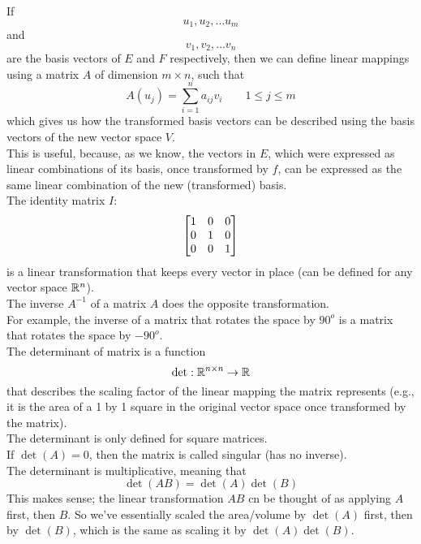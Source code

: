 \documentclass[12pt]{article}
\begin{document}
    If
    \[ u_1, u_2, \dots u_m \]
    and
    \[ v_1, v_2, \dots v_n \]
    are the basis vectors of $E$ and $F$
    respectively,
    then we can define linear mappings using 
    a matrix $A$ of dimension $m \times n$,
    such that 
    \[ A (u_j) = \sum_{i=1}^{n} a_{ij}v_i \qquad
    1 \leq j \leq m \]
    which gives us how the transformed basis
    vectors can be described using
    the basis vectors of the new vector space $V$. \\
    This is useful, because, as we know,
    the vectors in $E$,
    which were expressed as linear combinations
    of its basis,
    once transformed by $f$,
    can be expressed as the same linear combination
    of the new (transformed) basis. \\

    The identity matrix $I$:
    \[ \begin{bmatrix} 1 & 0 & 0 \\ 0 & 1 & 0 \\ 0 & 0 & 1 \end{bmatrix} \]
    is a linear transformation that keeps
    every vector in place
    (can be defined for any vector space $\mathbb{R}^n$). \\

    The inverse $A^{-1}$ of a matrix $A$
    does the opposite transformation. \\
    For example, the inverse of
    a matrix that rotates the space by $90^o$
    is a matrix that rotates the space by $-90^o$. \\

    The determinant of matrix is a function
    \[ \det: \mathbb{R}^{n \times n} \to \mathbb{R} \]
    that describes the scaling factor of the
    linear mapping the matrix represents
    (e.g., it is the area of a 1 by 1 square
    in the original vector space once
    transformed by the matrix). \\

    The determinant is only defined for square matrices. \\
    
    If $\det(A) = 0$,
    then the matrix is called singular
    (has no inverse). \\

    The determinant is multiplicative,
    meaning that
    \[ \det(AB) = \det(A)\det(B) \]
    This makes sense;
    the linear transformation $AB$
    cn be thought of as applying $A$
    first, then $B$.
    So we've essentially scaled the area/volume
    by $\det(A)$ first, then by $\det(B)$,
    which is the same as scaling it by $\det(A)\det(B)$. \\
\end{document}
